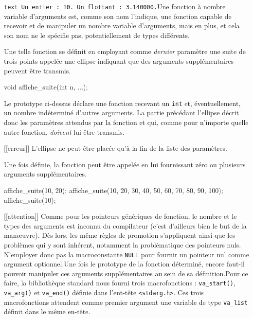 \documentclass[]{article}
\newenvironment{Shaded}{}{}
\newcommand{\DataTypeTok}[1]{\textcolor[rgb]{0.56,0.13,0.00}{{#1}}}
\newcommand{\DecValTok}[1]{\textcolor[rgb]{0.25,0.63,0.44}{{#1}}}
\newcommand{\NormalTok}[1]{{#1}}
\begin{document}
\texttt{text\ Un\ entier\ :\ 10.\ Un\ flottant\ :\ 3.140000.}Une
fonction à nombre variable d'arguments est, comme son nom l'indique, une
fonction capable de recevoir et de manipuler un nombre variable
d'arguments, mais en plus, et cela son nom ne le spécifie pas,
potentiellement de types différents.

Une telle fonction se définit en employant comme \emph{dernier}
paramètre une suite de trois points appelée une ellipse indiquant que
des arguments supplémentaires peuvent être transmis.

\begin{Shaded}
\begin{Highlighting}[]
\DataTypeTok{void} \NormalTok{affiche_suite(}\DataTypeTok{int} \NormalTok{n, ...);}
\end{Highlighting}
\end{Shaded}

Le prototype ci-dessus déclare une fonction recevant un \texttt{int} et,
éventuellement, un nombre indéterminé d'autres arguments. La partie
précédant l'ellipse décrit donc les paramètres attendus par la fonction
et qui, comme pour n'importe quelle autre fonction, \emph{doivent} lui
être transmis.

{[}{[}erreur{]}{]} \textbar{} L'ellipse ne peut être placée qu'à la fin
de la liste des paramètres.

Une fois définie, la fonction peut être appelée en lui fournissant zéro
ou plusieurs arguments supplémentaires.

\begin{Shaded}
\begin{Highlighting}[]
\NormalTok{affiche_suite(}\DecValTok{10}\NormalTok{, }\DecValTok{20}\NormalTok{);}
\NormalTok{affiche_suite(}\DecValTok{10}\NormalTok{, }\DecValTok{20}\NormalTok{, }\DecValTok{30}\NormalTok{, }\DecValTok{40}\NormalTok{, }\DecValTok{50}\NormalTok{, }\DecValTok{60}\NormalTok{, }\DecValTok{70}\NormalTok{, }\DecValTok{80}\NormalTok{, }\DecValTok{90}\NormalTok{, }\DecValTok{100}\NormalTok{);}
\NormalTok{affiche_suite(}\DecValTok{10}\NormalTok{);}
\end{Highlighting}
\end{Shaded}

{[}{[}attention{]}{]} \textbar{} Comme pour les pointeurs génériques de
fonction, le nombre et le types des arguments est inconnu du compilateur
(c'est d'ailleurs bien le but de la manœuvre). Dès lors, les même règles
de promotion s'appliquent ainsi que les problèmes qui y sont inhérent,
notamment la problématique des pointeurs nuls. N'employer donc pas la
macroconstante \texttt{NULL} pour fournir un pointeur nul comme argument
optionnel.Une fois le prototype de la fonction déterminé, encore faut-il
pouvoir manipuler ces arguments supplémentaires au sein de sa
définition.Pour ce faire, la bibliothèque standard nous fourni trois
macrofonctions : \texttt{va\_start()}, \texttt{va\_arg()} et
\texttt{va\_end()} définie dans l'ent-tête
\texttt{\textless{}stdarg.h\textgreater{}}. Ces trois macrofonctions
attendent comme premier argument une variable de type \texttt{va\_list}
définit dans le même en-tête.
\end{document}
